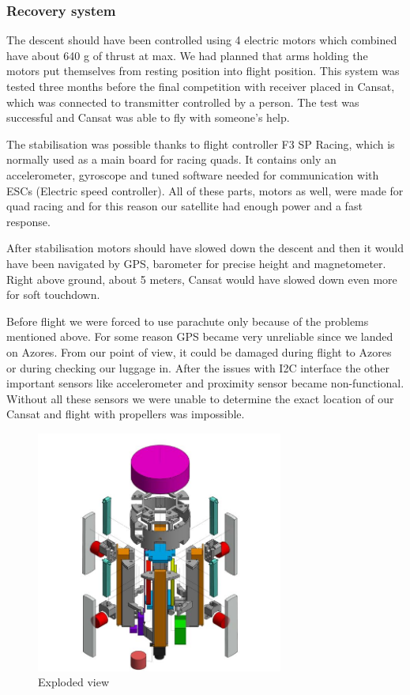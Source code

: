 \documentclass{cfp}
\begin{document}
\subsubsection{Recovery system}
\par The descent should have been controlled using 4 electric motors which combined have about 640 g of thrust at max. We had planned that arms holding the motors put themselves from resting position into flight position. This system was tested three months before the final competition with receiver placed in Cansat, which was connected to transmitter controlled by a person. The test was successful and Cansat was able to fly with someone’s help. 
\par The stabilisation was possible thanks to flight controller F3 SP Racing, which is normally used as a main board for racing quads. It contains only an accelerometer, gyroscope and tuned software needed for communication with ESCs (Electric speed controller). All of these parts, motors as well, were made for quad racing and for this reason our satellite had enough power and a fast response.
\par After stabilisation motors should have slowed down the descent and then it would have been navigated by GPS, barometer for precise height and magnetometer. Right above ground, about 5 meters, Cansat would have slowed down even more for soft touchdown.
\par Before flight we were forced to use parachute only because of the problems mentioned above. For some reason GPS became very unreliable since we landed on Azores. From our point of view, it could be damaged during flight to Azores or during checking our luggage in. After the issues with  I2C interface the other important sensors like accelerometer and proximity sensor became non-functional. Without all these sensors we were unable to determine the exact location of our Cansat and flight with propellers was impossible.
\begin{figure}[!h]
\centering
\caption{Exploded view}
\includegraphics[width=230pt]{exploded_view.JPG}
\end{figure}
\end{document}
